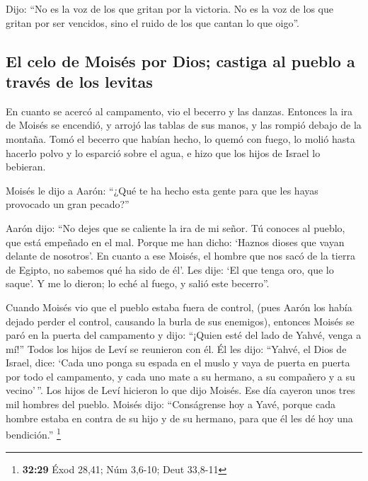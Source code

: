 \begin{paracol}{2}
 Dijo: ``No es la voz de los que gritan por la victoria.
No es la voz de los que gritan por ser vencidos, sino el ruido de los
que cantan lo que oigo''.

\hypertarget{el-celo-de-moisuxe9s-por-dios-castiga-al-pueblo-a-travuxe9s-de-los-levitas}{%
\subsection{El celo de Moisés por Dios; castiga al pueblo a través de
los
levitas}\label{el-celo-de-moisuxe9s-por-dios-castiga-al-pueblo-a-travuxe9s-de-los-levitas}}

 En cuanto se acercó al campamento, vio el becerro y las
danzas. Entonces la ira de Moisés se encendió, y arrojó las tablas de
sus manos, y las rompió debajo de la montaña.  Tomó el
becerro que habían hecho, lo quemó con fuego, lo molió hasta hacerlo
polvo y lo esparció sobre el agua, e hizo que los hijos de Israel lo
bebieran.

 Moisés le dijo a Aarón: ``¿Qué te ha hecho esta gente
para que les hayas provocado un gran pecado?''

 Aarón dijo: ``No dejes que se caliente la ira de mi
señor. Tú conoces al pueblo, que está empeñado en el mal.
 Porque me han dicho: `Haznos dioses que vayan delante de
nosotros'. En cuanto a ese Moisés, el hombre que nos sacó de la tierra
de Egipto, no sabemos qué ha sido de él'.  Les dije: `El
que tenga oro, que lo saque'. Y me lo dieron; lo eché al fuego, y salió
este becerro''.

 Cuando Moisés vio que el pueblo estaba fuera de control,
(pues Aarón los había dejado perder el control, causando la burla de sus
enemigos),  entonces Moisés se paró en la puerta del
campamento y dijo: ``¡Quien esté del lado de Yahvé, venga a mí!'' Todos
los hijos de Leví se reunieron con él.  Él les dijo:
``Yahvé, el Dios de Israel, dice: `Cada uno ponga su espada en el muslo
y vaya de puerta en puerta por todo el campamento, y cada uno mate a su
hermano, a su compañero y a su vecino'\,''.  Los hijos de
Leví hicieron lo que dijo Moisés. Ese día cayeron unos tres mil hombres
del pueblo.  Moisés dijo: ``Conságrense hoy a Yavé,
porque cada hombre estaba en contra de su hijo y de su hermano, para que
él les dé hoy una bendición.'' \footnote{\textbf{32:29} Éxod 28,41; Núm
  3,6-10; Deut 33,8-11}


\end{paracol}
